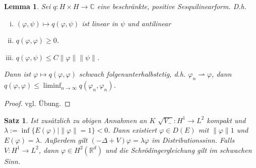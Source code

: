 \documentclass[
paper=a4,
bibtotocnumbered,
liststotocnumbered,
tablecaptionabove,
pointlessnumbers,
twoside,
openright,
10pt
]
{report}
\let\phi\varphi
\newtheorem{satz}[thm]{Satz}
\newtheorem{lem}[thm]{Lemma}
\theoremstyle{definition}
\numberwithin{equation}{chapter}
\begin{document}
\begin{lem}\label{5.1}
Sei $q: H\times H\to \mathbb C$ eine beschränkte, positive Sesquilinearform. D.h.
\begin{enumerate}[(i)]
\item $(\phi, \psi) \mapsto q(\phi, \psi)$ ist linear in $\psi$ und antilinear 
\item $q(\phi, \phi) \ge 0$.
\item $q(\phi, \psi) \le C\| \phi\| \| \psi\|$.
\end{enumerate}
Dann ist $\phi \mapsto q(\phi, \phi)$ schwach folgenunterhalbstetig, d.h. $\phi_n \rightharpoonup \phi$, dann $q(\phi, \phi) \le \liminf_{n\to \infty} q(\phi_n, \phi_n)$.
\end{lem}
\begin{proof}
vgl. Übung.
\end{proof}
\begin{satz}
Ist zusätzlich zu obigen Annahmen an $K$ $\sqrt{V_-} : H^1 \to L^2$ kompakt und $\lambda:= \inf\{E(\phi) | \|\phi\| =1\} <0$. Dann existiert $\phi \in D(E)$ mit $\| \phi \| 1$ und $E(\phi)=\lambda$. Außerdem gilt $(-\Delta + V) \phi = \lambda \phi$ im Distributionssinn. Falls $V: H^1 \to L^2$, dann $\phi \in H^2(\mathbb R^d)$ und die Schrödingergleichung gilt im schwachen Sinn.
\end{satz}
\end{document}
